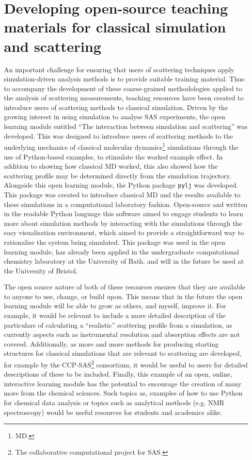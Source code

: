 \section{Developing open-source teaching materials for classical simulation and scattering}
An important challenge for ensuring that users of scattering techniques apply simulation-driven analysis methods is to provide suitable training material.
Thus to accompany the development of these coarse-grained methodologies applied to the analysis of scattering measurements, teaching resources have been created to introduce users of scattering methods to classical simulation.
Driven by the growing interest in using simulation to analyse SAS experiments,\autocite{hub_interpreting_2018,perkins_atomistic_2016} the open learning module entitled ``The interaction between simulation and scattering'' was developed.\autocite{mccluskey_introduction_2019,mccluskey_pythoninchemistry/sim_and_scat_2019}
This was designed to introduce users of scattering methods to the underlying mechanics of classical molecular dynamics\footnote{MD.} simulations through the use of Python-based examples, to stimulate the worked example effect.
In addition to showing how classical MD worked, this also showed how the scattering profile may be determined directly from the simulation trajectory.
Alongside this open learning module, the Python package \texttt{pylj} was developed.\autocite{mccluskey_pylj_2018,mccluskey_arm61/pylj_2019-2}
This package was created to introduce classical MD and the results available to these simulations in a computational laboratory fashion.
Open-source and written in the readable Python language this software aimed to engage students to learn more about simulation methods by interacting with the simulations through the easy visualisation environment, which aimed to provide a straightforward way to rationalise the system being simulated.
This package was used in the open learning module, has already been applied in the undergraduate computational chemistry laboratory at the University of Bath, and will in the future be used at the University of Bristol.

The open source nature of both of these resources ensures that they are available to anyone to use, change, or build upon.
This means that in the future the open learning module will be able to grow as others, and myself, improve it.
For example, it would be relevant to include a more detailed description of the particulars of calculating a ``realistic'' scattering profile from a simulation, as currently aspects such as instrumental resolution and absorption effects are not covered.
Additionally, as more and more methods for producing starting structures for classical simulations that are relevant to scattering are developed, for example by the CCP-SAS\footnote{The collaborative computational project for SAS.} consortium, it would be useful to users for detailed descriptions of these to be included.
Finally, this example of an open, online, interactive learning module has the potential to encourage the creation of many more from the chemical sciences.
Such topics as, examples of how to use Python for chemical data analysis or topics such as analytical methods (e.g. NMR spectroscopy) would be useful resources for students and academics alike.

